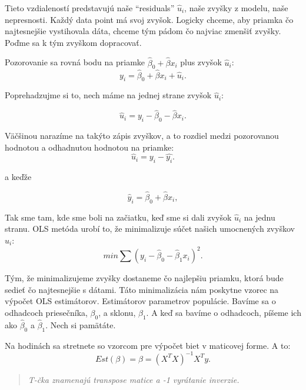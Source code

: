 Tieto vzdialeností predstavujú naše ``residuals'' \(\hat{u}_i\), naše
zvyšky z modelu, naše nepresnosti. Každý data point má svoj zvyšok.
Logicky chceme, aby priamka čo najtesnejšie vystihovala dáta, chceme tým
pádom čo najviac zmenšiť zvyšky. Poďme sa k tým zvyškom dopracovať.

Pozorovanie sa rovná bodu na priamke \(\hat\beta_0 + \hat\beta{x}_i\)
plus zvyšok \(\hat{u}_i\):
\[ y_i = \hat\beta_0 + \hat\beta{x}_i + \hat{u}_i.\]

\begin{center}

Poprehadzujme si to, nech máme na jednej strane zvyšok \(\hat{u}_i\):

\end{center}
\[ \hat{u}_i = y_i - \hat\beta_0 - \hat\beta{x}_i.\]

Väčšinou narazíme na takýto zápis zvyškov, a to rozdiel medzi
pozorovanou hodnotou a odhadnutou hodnotou na priamke:
\[\hat{u}_i = y_i - \hat{y_i}.\]

\begin{center}

a keďže
\end{center}
\[ \hat{y}_i =\hat\beta_0 + \hat\beta{x}_i,\]

Tak sme tam, kde sme boli na začiatku, keď sme si dali zvyšok
\(\hat{u}_i\) na jednu stranu. OLS metóda urobí to, že minimalizuje
súčet našich umocnených zvyškov \(\hat{u}_i\):
\[min\sum (y_i - \hat\beta_0 - \hat\beta_1{x}_i)^2.\]

Tým, že minimalizujeme zvyšky dostaneme čo najlepšiu priamku, ktorá bude
sedieť čo najtesnejšie s dátami. Táto minimalizácia nám poskytne vzorec
na výpočet OLS estimátorov. Estimátorov parametrov populácie. Bavíme sa
o odhadcoch priesečníka, \(\beta_0\), a sklonu, \(\beta_1\). A keď sa
bavíme o odhadcoch, píšeme ich ako \(\hat\beta_0\) a \(\hat\beta_1\).
Nech si pamätáte.

Na hodinách sa stretnete so vzorcom pre výpočet biet v maticovej forme.
A to:
\[Est(\beta) = \hat\beta = (X^TX)^{-1}X^Ty.\]

\begin{quote}
\emph{T-čka znamenajú transpose matice a -1 vyrátanie inverzie.}
\end{quote}

\begin{Shaded}
\end{Shaded}

